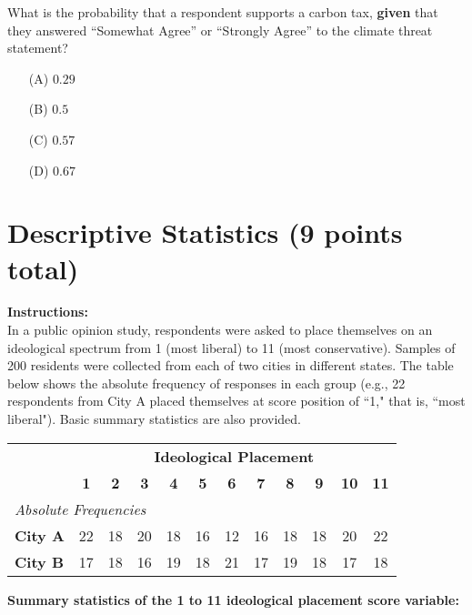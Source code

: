 \documentclass{article}
\begin{document}
\begin{enumerate}
What is the probability that a respondent supports a carbon tax, \textbf{given} that they answered “Somewhat Agree” or “Strongly Agree” to the climate threat statement?

\begin{enumerate}
  \item[(A)] $0.29$  
  \item[(B)] $0.5$  
  \item[(C)] $0.57$   
  \item[(D)] $0.67$  
\end{enumerate}


\end{enumerate}

\newpage
\section{Descriptive Statistics (9 points total)} 
\noindent\textbf{Instructions:} \\
In a public opinion study, respondents were asked to place themselves on an ideological spectrum from 1 (most liberal) to 11 (most conservative). Samples of 200 residents were collected from each of two cities in different states. The table below shows the absolute frequency of responses in each group (e.g., 22 respondents from City A placed themselves at score position of ``1," that is, ``most liberal"). Basic summary statistics are also provided.

\begin{center}
\begin{tabular}{lccccccccccc}
\hline
& \multicolumn{11}{c}{\textbf{Ideological Placement}} \\ \cline{2-12}
& \textbf{1} & \textbf{2} & \textbf{3} & \textbf{4} & \textbf{5} & \textbf{6} & \textbf{7} & \textbf{8} & \textbf{9} & \textbf{10} & \textbf{11} \\
\hline
\multicolumn{12}{l}{\textit{Absolute Frequencies}} \\
\textbf{City A} & 22 & 18 & 20 & 18 & 16 & 12 & 16 & 18 & 18 & 20 & 22 \\
\textbf{City B} & 17 & 18 & 16 & 19 & 18 & 21 & 17 & 19 & 18 & 17 & 18 \\
\hline
\end{tabular}
\end{center}

\textbf{Summary statistics of the 1 to 11 ideological placement score variable:}
\end{document}
